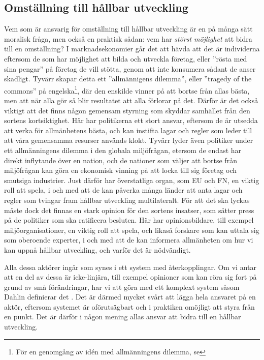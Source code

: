 \documentclass{article}
\begin{document}
\subsection{Omställning till hållbar utveckling}
Vem som är ansvarig för omställning till hållbar utveckling är en på många sätt moralisk fråga, men också en praktisk sådan: vem har \emph{störst möjlighet} att bidra till en omställning? I marknadsekonomier går det att hävda att det är individerna eftersom de som har möjlighet att bilda och utveckla företag, eller ''rösta med sina pengar'' på företag de vill stötta, genom att inte konsumera sådant de anser skadligt. Tyvärr skapar detta ett ''allmännigens dilemma'', eller ''tragedy of the commons'' på engelska\footnote{För en genomgång av idén med allmänningens dilemma, se }, där den enskilde vinner på att bortse från allas bästa, men att när alla gör så blir resultatet att alla förlorar på det. Därför är det också viktigt att det finns någon gemensam styrning som skyddar samhället från den sortens kortsiktighet. Här har politikerna ett stort ansvar, eftersom de är utsedda att verka för allmänhetens bästa, och kan instifta lagar och regler som leder till att våra gemensamma resurser används klokt. Tyvärr lyder även politiker under ett allmänningens dilemma i den globala miljöfrågan, etersom de endast har direkt inflytande över en nation, och de nationer som väljer att bortse från miljöfrågan kan göra en ekonomisk vinning på att locka till sig företag och smutsiga industrier. Just därför har överstatliga organ, som EU och FN, en viktig roll att spela, i och med att de kan påverka många länder att anta lagar och regler som tvingar fram hållbar utveckling multilateralt. För att det ska lyckas måste dock det finnas en stark opinion för den sortens insatser, som sätter press på de politiker som ska ratificera besluten. Här har opinionsbildare, till exempel miljöorganisationer, en viktig roll att spela, och likaså forskare som kan uttala sig som oberoende experter, i och med att de kan informera allmänheten om hur vi kan uppnå hållbar utveckling, och varför det är nödvändigt.

Alla dessa aktörer ingår som synes i ett system med återkopplingar. Om vi antar att en del av dessa är icke-linjära, till exempel opinioner som kan röra sig fort på grund av små förändringar, har vi att göra med ett komplext system såsom Dahlin definierar det . Det är därmed mycket svårt att lägga hela ansvaret på en aktör, eftersom systemet är oförutsägbart och i praktiken omöjligt att styra från en punkt. Det är därför i någon mening allas ansvar att bidra till en hållbar utveckling.

\end{document}
